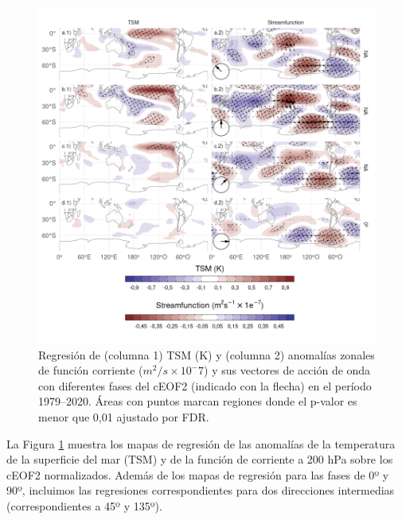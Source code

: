 \documentclass[12pt,oneside,a4paper]{reedthesis}
\begin{document}
\begin{figure}

{\centering \includegraphics{figures/20-ceofs/sst-psi-2-1} 

}

\caption{Regresión de (columna 1) TSM (K) y (columna 2) anomalías zonales de función corriente (\(m^2/s\times10^-7\)) y sus vectores de acción de onda con diferentes fases del cEOF2 (indicado con la flecha) en el período 1979--2020. Áreas con puntos marcan regiones donde el p-valor es menor que 0,01 ajustado por FDR.}\label{fig:sst-psi-2}
\end{figure}

La Figura \ref{fig:sst-psi-2} muestra los mapas de regresión de las anomalías de la temperatura de la superficie del mar (TSM) y de la función de corriente a 200 hPa sobre los cEOF2 normalizados.
Además de los mapas de regresión para las fases de 0º y 90º, incluimos las regresiones correspondientes para dos direcciones intermedias (correspondientes a 45º y 135º).
\end{document}
